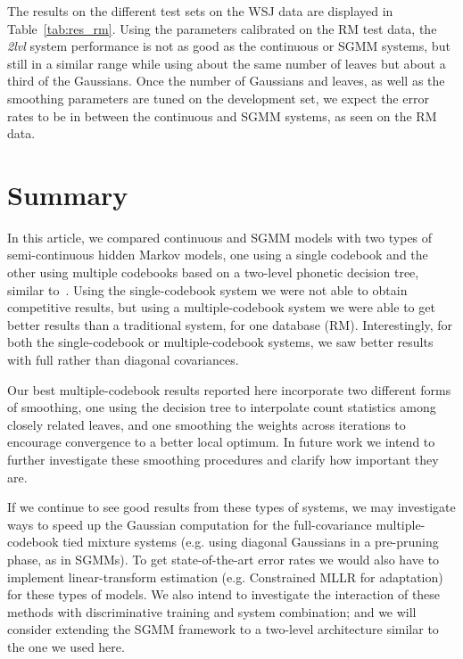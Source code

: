 \documentclass{article}
\begin{document}
The results on the different test sets on the WSJ data are displayed in
Table~\ref{tab:res_rm}.
Using the parameters calibrated on the RM test data, the {\em 2lvl} system
performance is not as good as the continuous or SGMM systems, but still
in a similar range while using about the same number of leaves but about a
third of the Gaussians.
Once the number of Gaussians and leaves, as well as the smoothing parameters 
are tuned on the development set, we expect the error rates to be in between 
the continuous and SGMM systems, as seen on the RM data.

\section{Summary}
\label{sec:summary}

In this article, we compared continuous and SGMM models with
two types of semi-continuous hidden Markov models, one using a single codebook 
and the other using multiple codebooks based on a two-level phonetic decision tree,
similar to~\cite{prasad2004t2b}.
Using the single-codebook system we were not able to obtain competitive
results, but using a multiple-codebook system 
we were able to get better results than a traditional system, for one
database (RM).  Interestingly,
for both the single-codebook or multiple-codebook systems, we saw better
results with full rather than diagonal covariances.  

Our best multiple-codebook results reported here incorporate two different forms of 
smoothing, one using the decision tree to interpolate count statistics among closely
related leaves, and one smoothing the weights across iterations to encourage 
convergence to a better local optimum.  In future work we intend to further investigate
these smoothing procedures and clarify how important they are.

If we continue to see good results from these types of systems, 
we may investigate ways to speed up the Gaussian computation for the 
full-covariance multiple-codebook tied mixture systems (e.g. using
diagonal Gaussians in a pre-pruning phase, as in SGMMs).  To get state-of-the-art
error rates we would also have to 
implement linear-transform estimation (e.g. Constrained MLLR for adaptation)
for these types of models.  We also intend to investigate the interaction of these
methods with discriminative training and system combination; and we will
consider extending the SGMM framework to a two-level architecture similar to
the one we used here.





\end{document}
